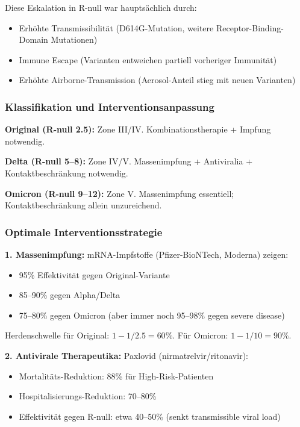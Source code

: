 ﻿\documentclass[a4paper,12pt,twoside]{article}
\theoremstyle{definition}
\begin{document}
Diese Eskalation in R-null war hauptsächlich durch:
\begin{itemize}
\item Erhöhte Transmissibilität (D614G-Mutation, weitere Receptor-Binding-Domain Mutationen)
\item Immune Escape (Varianten entweichen partiell vorheriger Immunität)
\item Erhöhte Airborne-Transmission (Aerosol-Anteil stieg mit neuen Varianten)
\end{itemize}

\subsubsection{Klassifikation und Interventionsanpassung}

\textbf{Original (R-null 2.5):} Zone III/IV. Kombinationstherapie + Impfung notwendig.

\textbf{Delta (R-null 5--8):} Zone IV/V. Massenimpfung + Antiviralia + Kontaktbeschränkung notwendig.

\textbf{Omicron (R-null 9--12):} Zone V. Massenimpfung essentiell; Kontaktbeschränkung allein unzureichend.

\subsubsection{Optimale Interventionsstrategie}

\textbf{1. Massenimpfung:} mRNA-Impfstoffe (Pfizer-BioNTech, Moderna) zeigen:
\begin{itemize}
\item 95\% Effektivität gegen Original-Variante
\item 85--90\% gegen Alpha/Delta
\item 75--80\% gegen Omicron (aber immer noch 95--98\% gegen severe disease)
\end{itemize}

Herdenschwelle für Original: $1 - 1/2.5 = 60\%$. Für Omicron: $1 - 1/10 = 90\%$.

\textbf{2. Antivirale Therapeutika:} Paxlovid (nirmatrelvir/ritonavir):
\begin{itemize}
\item Mortalitäts-Reduktion: 88\% für High-Risk-Patienten
\item Hospitalisierungs-Reduktion: 70--80\%
\item Effektivität gegen R-null: etwa 40--50\% (senkt transmissible viral load)
\end{itemize}
\end{document}
